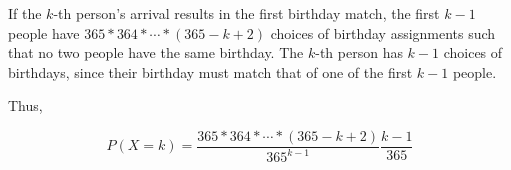 If the $k$-th person's arrival results in the first birthday match, the first
$k-1$ people have $365*364*\cdots*(365-k+2)$ choices of birthday assignments
such that no two people have the same birthday. The $k$-th person has $k-1$
choices of birthdays, since their birthday must match that of one of the first 
$k-1$ people.

Thus,

$$P(X=k) = \frac{365*364*\cdots*(365-k+2)}{365^{k-1}} \frac{k-1}{365}$$